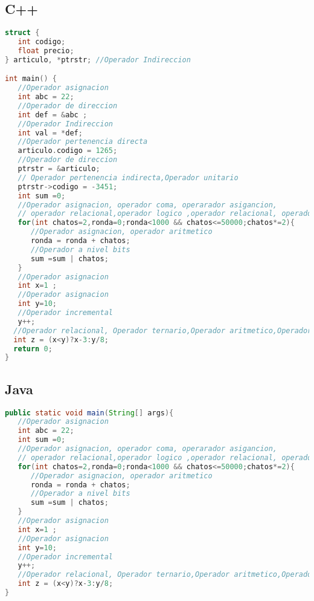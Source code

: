 \subsection{C++}
\begin{lstlisting}[language=C++]
struct {
   int codigo;
   float precio;
} articulo, *ptrstr; //Operador Indireccion

int main() {
   //Operador asignacion
   int abc = 22;
   //Operador de direccion
   int def = &abc ;
   //Operador Indireccion
   int val = *def;
   //Operador pertenencia directa
   articulo.codigo = 1265;
   //Operador de direccion
   ptrstr = &articulo;
   // Operador pertenencia indirecta,Operador unitario
   ptrstr->codigo = -3451;
   int sum =0;
   //Operador asignacion, operador coma, operarador asigancion,
   // operador relacional,operador logico ,operador relacional, operador asignacion
   for(int chatos=2,ronda=0;ronda<1000 && chatos<=50000;chatos*=2){
      //Operador asignacion, operador aritmetico
      ronda = ronda + chatos;
      //Operador a nivel bits
      sum =sum | chatos;
   }
   //Operador asignacion
   int x=1 ;
   //Operador asignacion
   int y=10;
   //Operador incremental
   y++; 
  //Operador relacional, Operador ternario,Operador aritmetico,Operador aritmetico
  int z = (x<y)?x-3:y/8;
  return 0;
}	
\end{lstlisting}
\subsection{Java}
\begin{lstlisting}[language=Java]
public static void main(String[] args){
   //Operador asignacion
   int abc = 22;
   int sum =0;
   //Operador asignacion, operador coma, operarador asigancion,
   // operador relacional,operador logico ,operador relacional, operador asignacion
   for(int chatos=2,ronda=0;ronda<1000 && chatos<=50000;chatos*=2){
      //Operador asignacion, operador aritmetico
      ronda = ronda + chatos;
      //Operador a nivel bits
      sum =sum | chatos;
   }
   //Operador asignacion
   int x=1 ;
   //Operador asignacion
   int y=10;
   //Operador incremental
   y++; 
   //Operador relacional, Operador ternario,Operador aritmetico,Operador aritmetico
   int z = (x<y)?x-3:y/8;
}
\end{lstlisting}

